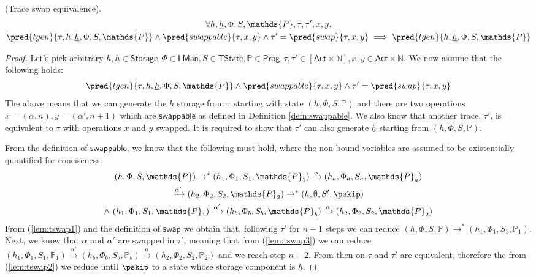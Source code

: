 \begin{lem}
	\label{lem:traceSwapEq}
	(Trace swap equivalence).
	\begin{gather*}
		\forall h, \underline{h}, \Phi, S, \mathds{P}, \tau, \tau', x, y \ldotp \\
		\pred{tgen}{\tau, h, \underline{h}, \Phi, S, \mathds{P}}
			\land
		\pred{swappable}{\tau, x, y}
			\land
		\tau' = \pred{swap}{\tau, x, y}
			\implies
		\pred{tgen}{h, \underline{h}, \Phi, S, \mathds{P}}
	\end{gather*}
	\begin{proof}
	Let's pick arbitrary $h, \underline{h} \in \mathsf{Storage}, \Phi \in \mathsf{LMan}, S \in \mathsf{TState}, \mathds{P} \in \mathsf{Prog}, \tau, \tau' \in [\mathsf{Act} \times \mathds{N}], x, y \in \mathsf{Act} \times \mathds{N}$. We now assume that the following holds:
	\[
		\pred{tgen}{\tau, h, \underline{h}, \Phi, S, \mathds{P}}
			\land
		\pred{swappable}{\tau, x, y}
			\land
		\tau' = \pred{swap}{\tau, x, y}
	\]
	The above means that we can generate the $\underline{h}$ storage from $\tau$ starting with state $(h, \Phi, S, \mathds{P})$ and there are two operations $x = (\alpha, n), y = (\alpha', n + 1)$ which are $\mathsf{swappable}$ as defined in Definition \ref{defn:swappable}. We also know that another trace, $\tau'$, is equivalent to $\tau$ with operations $x$ and $y$ swapped. It is required to show that $\tau'$ can also generate $\underline{h}$ starting from $(h, \Phi, S, \mathds{P})$.
	
	From the definition of $\mathsf{swappable}$, we know that the following must hold, where the non-bound variables are assumed to be existentially quantified for conciseness:
	\begin{gather}
		\label{lem:tswap1}
		(h, \Phi, S, \mathds{P})
			\rightarrow^*
		(h_1, \Phi_1, S_1, \mathds{P}_1)
			\xrightarrow{\alpha}
		(h_a, \Phi_a, S_a, \mathds{P}_a) \\
		\label{lem:tswap2}
			\xrightarrow{\alpha'}
		(h_2, \Phi_2, S_2, \mathds{P}_2)
			\rightarrow^*
		(\underline{h}, \emptyset, S', \pskip) \\
		\label{lem:tswap3}
			\land\
		(h_1, \Phi_1, S_1, \mathds{P}_1)
			\xrightarrow{\alpha'}
		(h_b, \Phi_b, S_b, \mathds{P}_b)
			\xrightarrow{\alpha}
		(h_2, \Phi_2, S_2, \mathds{P}_2)
	\end{gather}
	From (\ref{lem:tswap1}) and the definition of $\mathsf{swap}$ we obtain that, following $\tau'$ for $n - 1$ steps we can reduce $(h, \Phi, S, \mathds{P}) \rightarrow^* (h_1, \Phi_1, S_1, \mathds{P}_1)$. Next, we know that $\alpha$ and $\alpha'$ are swapped in $\tau'$, meaning that from (\ref{lem:tswap3}) we can reduce $(h_1, \Phi_1, S_1, \mathds{P}_1) \xrightarrow{\alpha'} (h_b, \Phi_b, S_b, \mathds{P}_b) \xrightarrow{\alpha} (h_2, \Phi_2, S_2, \mathds{P}_2)$ and we reach step $n+2$. From then on $\tau$ and $\tau'$ are equivalent, therefore the from (\ref{lem:tswap2}) we reduce until $\pskip$ to a state whose storage component is $\underline{h}$.
	\end{proof}
\end{lem}